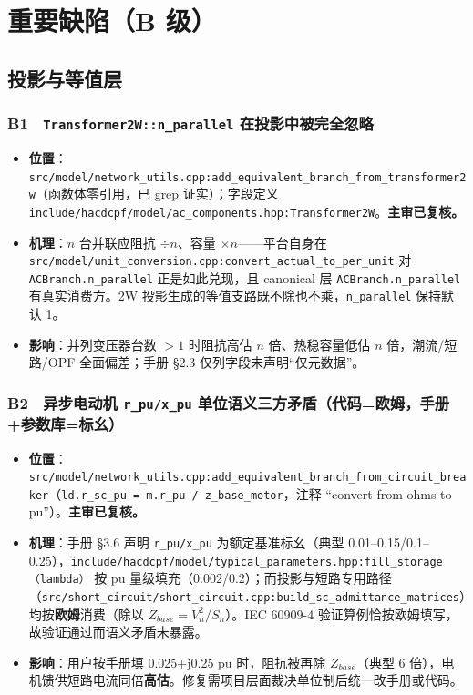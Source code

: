 \documentclass[11pt,a4paper,fontset=fandol]{ctexart}
\newcommand{\file}[1]{\texttt{#1}}
\begin{document}
\newpage
\section{重要缺陷（B 级）}
\label{sec:major}

\subsection{投影与等值层}

\subsubsection*{B1　\texttt{Transformer2W::n\_parallel} 在投影中被完全忽略}
\begin{itemize}
  \item \textbf{位置}：\file{src/model/network\_utils.cpp:add\_equivalent\_branch\_from\_transformer2w}（函数体零引用，已 grep 证实）；字段定义 \file{include/hacdcpf/model/ac\_components.hpp:Transformer2W}。\textbf{主审已复核。}
  \item \textbf{机理}：$n$ 台并联应阻抗 $\div n$、容量 $\times n$——平台自身在 \file{src/model/unit\_conversion.cpp:convert\_actual\_to\_per\_unit} 对 \texttt{ACBranch.n\_parallel} 正是如此兑现，且 canonical 层 \texttt{ACBranch.n\_parallel} 有真实消费方。2W 投影生成的等值支路既不除也不乘，\texttt{n\_parallel} 保持默认 1。
  \item \textbf{影响}：并列变压器台数 $>1$ 时阻抗高估 $n$ 倍、热稳容量低估 $n$ 倍，潮流/短路/OPF 全面偏差；手册 \S 2.3 仅列字段未声明``仅元数据''。
\end{itemize}

\subsubsection*{B2　异步电动机 \texttt{r\_pu/x\_pu} 单位语义三方矛盾（代码=欧姆，手册+参数库=标幺）}
\begin{itemize}
  \item \textbf{位置}：\file{src/model/network\_utils.cpp:add\_equivalent\_branch\_from\_circuit\_breaker}（\texttt{ld.r\_sc\_pu = m.r\_pu / z\_base\_motor}，注释 ``convert from ohms to pu''）。\textbf{主审已复核。}
  \item \textbf{机理}：手册 \S 3.6 声明 \texttt{r\_pu/x\_pu} 为额定基准标幺（典型 0.01--0.15/0.1--0.25），\file{include/hacdcpf/model/typical\_parameters.hpp:fill\_storage（lambda）} 按 pu 量级填充（0.002/0.2）；而投影与短路专用路径（\file{src/short\_circuit/short\_circuit.cpp:build\_sc\_admittance\_matrices}）均按\textbf{欧姆}消费（除以 $Z_{base}=V_n^2/S_n$）。IEC 60909-4 验证算例恰按欧姆填写，故验证通过而语义矛盾未暴露。
  \item \textbf{影响}：用户按手册填 0.025+j0.25 pu 时，阻抗被再除 $Z_{base}$（典型 6 倍），电机馈供短路电流同倍\textbf{高估}。修复需项目层面裁决单位制后统一改手册或代码。
\end{itemize}
\end{document}
